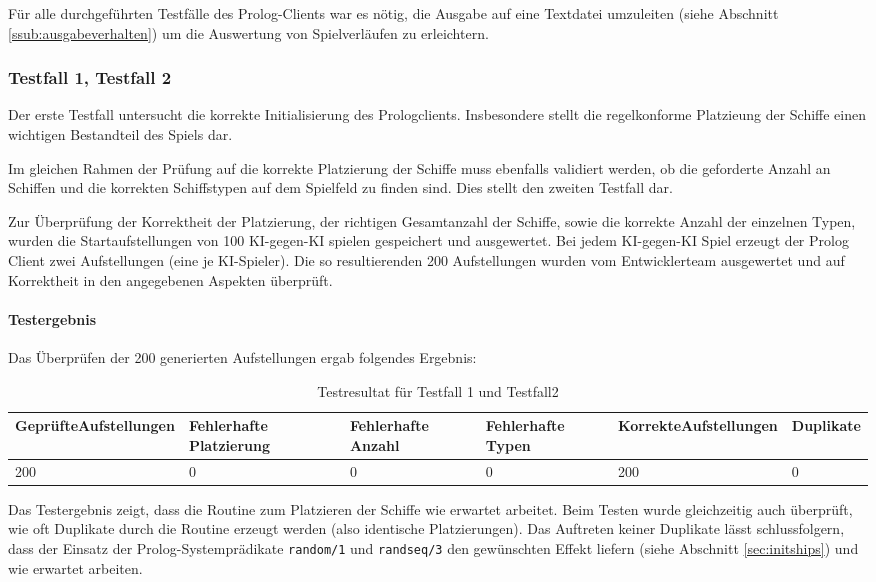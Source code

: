 	Für alle durchgeführten Testfälle des Prolog-Clients war es nötig, die Ausgabe auf eine Textdatei umzuleiten (siehe Abschnitt \ref{ssub:ausgabeverhalten}) 
	um die Auswertung von Spielverläufen zu erleichtern.

	\subsubsection{Testfall 1, Testfall 2} %
	\label{ssub:testfall_1_testfall_2}
		Der erste Testfall untersucht die korrekte Initialisierung des Prologclients. Insbesondere stellt die regelkonforme Platzieung der
		Schiffe einen wichtigen Bestandteil des Spiels dar. 

		Im gleichen Rahmen der Prüfung auf die korrekte Platzierung der Schiffe muss ebenfalls validiert werden, ob die geforderte Anzahl an Schiffen und die
		korrekten Schiffstypen auf dem Spielfeld zu finden sind. Dies stellt den zweiten Testfall dar.
	
		Zur Überprüfung der Korrektheit der Platzierung, der richtigen Gesamtanzahl der Schiffe, sowie die korrekte Anzahl der einzelnen Typen, wurden 
		die Startaufstellungen von 100 KI-gegen-KI spielen gespeichert und ausgewertet. Bei jedem KI-gegen-KI Spiel erzeugt der Prolog Client zwei 
		Aufstellungen (eine je KI-Spieler). Die so resultierenden 200 Aufstellungen wurden vom Entwicklerteam ausgewertet und auf Korrektheit in den 
		angegebenen Aspekten überprüft.
		
		\paragraph{Testergebnis} %
		\label{par:testergebnis}
			Das Überprüfen der 200 generierten Aufstellungen ergab folgendes Ergebnis:
			\begin{table}[H] %
				\centering
				\begin{tabular}{|p{}|p{}|p{}|p{.15\textwidth}|p{}|p{}|} 
					\hline
					Geprüfte\newline Aufstellungen & Fehlerhafte Platzierung&Fehlerhafte Anzahl&Fehlerhafte Typen&Korrekte\newline Aufstellungen&Duplikate\\ 
					\hline\hline
					200 & 0 & 0 & 0 & 200 & 0\\
					\hline
				\end{tabular}
				\caption{Testresultat für Testfall 1 und Testfall2}
				\label{tbl:tf1tf2}
			\end{table}
		Das Testergebnis zeigt, dass die Routine zum Platzieren der Schiffe wie erwartet arbeitet. Beim Testen wurde gleichzeitig auch überprüft, 
		wie oft Duplikate durch die Routine erzeugt werden (also identische Platzierungen).
		Das Auftreten keiner Duplikate lässt schlussfolgern, dass der Einsatz der Prolog-Systemprädikate \texttt{random/1} und \texttt{randseq/3} 
		den gewünschten Effekt liefern (siehe Abschnitt \ref{sec:initships}) und wie erwartet arbeiten.
		
